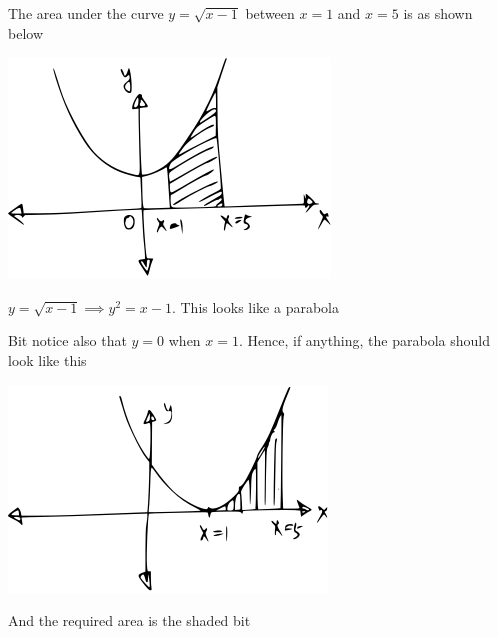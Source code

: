 \documentclass[14pt,fleqn]{extarticle}
\begin{document}
 
\begin{snippet}
    
    \incorrect
    
    The area under the curve $y = \sqrt{x-1}$ between $x=1$ and $x=5$ is as shown below 
    
    \begin{center}
\includegraphics[scale=1.4]{wrong.svg}
\end{center}
    
    \reason
    
    $y = \sqrt{x-1} \implies y^2 = x - 1$. This looks like a parabola \newline 
    
    Bit notice also that $ y =0$ when $x = 1$. Hence, if anything, the parabola 
    should look like this 
    
    \begin{center}
\includegraphics[scale=1.4]{right.svg}
\end{center}

    And the required area is the shaded bit 
    
\end{snippet} 
\end{document}
